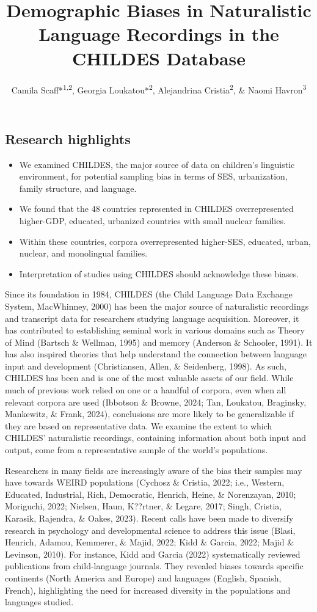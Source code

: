 \documentclass[
  man,floatsintext]{apa6}
\title{Demographic Biases in Naturalistic Language Recordings in the CHILDES Database}
\author{Camila Scaff*\textsuperscript{1,2}, Georgia Loukatou*\textsuperscript{2}, Alejandrina Cristia\textsuperscript{2}, \& Naomi Havron\textsuperscript{3}}
\date{}
\affiliation{\vspace{0.5cm}\textsuperscript{1} University of Zurich, Institute of Evolutionary Medicine (IEM), Switzerland\\\textsuperscript{2} PSL University, Laboratoire de Sciences Cognitives et de Psycholinguistique (ENS, EHESS, CNRS, DEC), France\\\textsuperscript{3} Haifa Univerity, Israel}
\providecommand{\tightlist}{%
  \setlength{\itemsep}{0pt}\setlength{\parskip}{0pt}}
\begin{document}
\maketitle

\subsection{Research highlights}\label{research-highlights}

\begin{itemize}
\tightlist
\item
  We examined CHILDES, the major source of data on children's linguistic environment, for potential sampling bias in terms of SES, urbanization, family structure, and language.
\item
  We found that the 48 countries represented in CHILDES overrepresented higher-GDP, educated, urbanized countries with small nuclear families.
\item
  Within these countries, corpora overrepresented higher-SES, educated, urban, nuclear, and monolingual families.
\item
  Interpretation of studies using CHILDES should acknowledge these biases.
\end{itemize}

\newpage

Since its foundation in 1984, CHILDES (the Child Language Data Exchange System, MacWhinney, 2000) has been the major source of naturalistic recordings and transcript data for researchers studying language acquisition. Moreover, it has contributed to establishing seminal work in various domains such as Theory of Mind (Bartsch \& Wellman, 1995) and memory (Anderson \& Schooler, 1991). It has also inspired theories that help understand the connection between language input and development (Christiansen, Allen, \& Seidenberg, 1998). As such, CHILDES has been and is one of the most valuable assets of our field. While much of previous work relied on one or a handful of corpora, even when all relevant corpora are used (Ibbotson \& Browne, 2024; Tan, Loukatou, Braginsky, Mankewitz, \& Frank, 2024), conclusions are more likely to be generalizable if they are based on representative data. We examine the extent to which CHILDES' naturalistic recordings, containing information about both input and output, come from a representative sample of the world's populations.

Researchers in many fields are increasingly aware of the bias their samples may have towards WEIRD populations (Cychosz \& Cristia, 2022; i.e., Western, Educated, Industrial, Rich, Democratic, Henrich, Heine, \& Norenzayan, 2010; Moriguchi, 2022; Nielsen, Haun, K??rtner, \& Legare, 2017; Singh, Cristia, Karasik, Rajendra, \& Oakes, 2023). Recent calls have been made to diversify research in psychology and developmental science to address this issue (Blasi, Henrich, Adamou, Kemmerer, \& Majid, 2022; Kidd \& Garcia, 2022; Majid \& Levinson, 2010). For instance, Kidd and Garcia (2022) systematically reviewed publications from child-language journals. They revealed biases towards specific continents (North America and Europe) and languages (English, Spanish, French), highlighting the need for increased diversity in the populations and languages studied.
\end{document}
